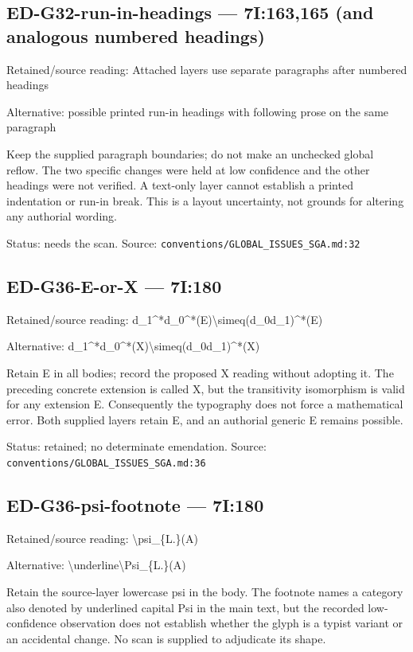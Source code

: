 \subsection*{ED-G32-run-in-headings — 7I:163,165 (and analogous numbered headings)}

Retained/source reading: Attached layers use separate paragraphs after numbered headings

Alternative: possible printed run-in headings with following prose on the same paragraph

Keep the supplied paragraph boundaries; do not make an unchecked global reflow. The two specific changes were held at low confidence and the other headings were not verified. A text-only layer cannot establish a printed indentation or run-in break. This is a layout uncertainty, not grounds for altering any authorial wording.

Status: needs the scan. Source: \nolinkurl{conventions/GLOBAL_ISSUES_SGA.md:32}

\subsection*{ED-G36-E-or-X — 7I:180}

Retained/source reading: d\_1\textasciicircum{}*d\_0\textasciicircum{}*(E)\textbackslash{}simeq(d\_0d\_1)\textasciicircum{}*(E)

Alternative: d\_1\textasciicircum{}*d\_0\textasciicircum{}*(X)\textbackslash{}simeq(d\_0d\_1)\textasciicircum{}*(X)

Retain E in all bodies; record the proposed X reading without adopting it. The preceding concrete extension is called X, but the transitivity isomorphism is valid for any extension E. Consequently the typography does not force a mathematical error. Both supplied layers retain E, and an authorial generic E remains possible.

Status: retained; no determinate emendation. Source: \nolinkurl{conventions/GLOBAL_ISSUES_SGA.md:36}

\subsection*{ED-G36-psi-footnote — 7I:180}

Retained/source reading: \textbackslash{}psi\_\{L.\}(A)

Alternative: \textbackslash{}underline\textbackslash{}Psi\_\{L.\}(A)

Retain the source-layer lowercase psi in the body. The footnote names a category also denoted by underlined capital Psi in the main text, but the recorded low-confidence observation does not establish whether the glyph is a typist variant or an accidental change. No scan is supplied to adjudicate its shape.

